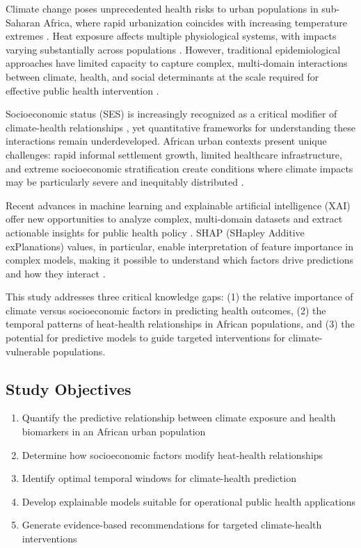 \documentclass[11pt,a4paper]{article}
\begin{document}
Climate change poses unprecedented health risks to urban populations in sub-Saharan Africa, where rapid urbanization coincides with increasing temperature extremes \cite{watts2019lancet, hoegh2018impacts}. Heat exposure affects multiple physiological systems, with impacts varying substantially across populations \cite{campbell2018heatwave, zhao2021mortality}. However, traditional epidemiological approaches have limited capacity to capture complex, multi-domain interactions between climate, health, and social determinants at the scale required for effective public health intervention \cite{honda2014heat, vicedo2021burden}.

Socioeconomic status (SES) is increasingly recognized as a critical modifier of climate-health relationships \cite{reid2009mapping, benmarhnia2015vulnerability}, yet quantitative frameworks for understanding these interactions remain underdeveloped. African urban contexts present unique challenges: rapid informal settlement growth, limited healthcare infrastructure, and extreme socioeconomic stratification create conditions where climate impacts may be particularly severe and inequitably distributed \cite{turok2012urbanisation, wilkinson2000johannesburg}.

Recent advances in machine learning and explainable artificial intelligence (XAI) offer new opportunities to analyze complex, multi-domain datasets and extract actionable insights for public health policy \cite{rajkomar2019machine, beam2018big}. SHAP (SHapley Additive exPlanations) values, in particular, enable interpretation of feature importance in complex models, making it possible to understand which factors drive predictions and how they interact \cite{lundberg2017unified}.

This study addresses three critical knowledge gaps: (1) the relative importance of climate versus socioeconomic factors in predicting health outcomes, (2) the temporal patterns of heat-health relationships in African populations, and (3) the potential for predictive models to guide targeted interventions for climate-vulnerable populations.

\subsection{Study Objectives}

\begin{enumerate}
\item Quantify the predictive relationship between climate exposure and health biomarkers in an African urban population
\item Determine how socioeconomic factors modify heat-health relationships
\item Identify optimal temporal windows for climate-health prediction
\item Develop explainable models suitable for operational public health applications
\item Generate evidence-based recommendations for targeted climate-health interventions
\end{enumerate}
\end{document}
